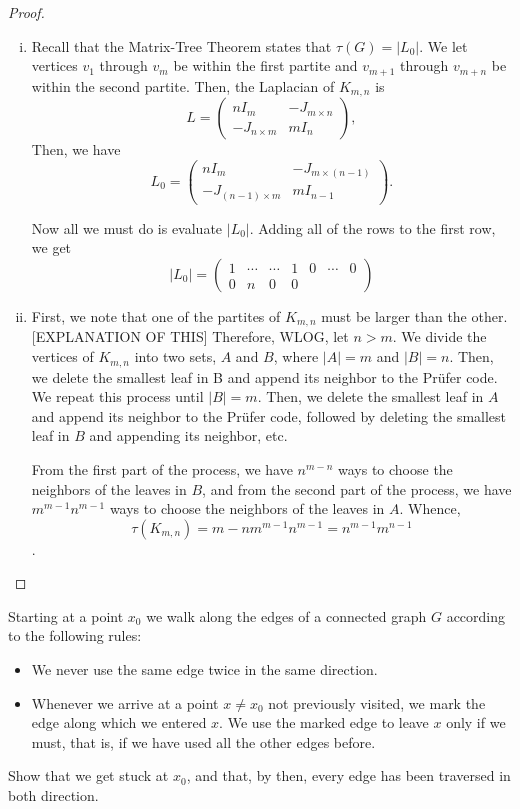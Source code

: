 \documentclass[11pt]{article}
\begin{document}
\begin{proof}
    \begin{enumerate}[(i)]
        \item Recall that the Matrix-Tree Theorem states that $\tau(G) = |L_0|$. We let vertices $v_1$ through $v_m$ be within the first partite and $v_{m+1}$ through $v_{m+n}$ be within the second partite. Then, the Laplacian of $K_{m,n}$ is \[L=\begin{pmatrix}nI_m&-J_{m \times n}\\-J_{n \times m}&mI_n\end{pmatrix},\] Then, we have
        \[
            L_0=\begin{pmatrix}nI_m&-J_{m \times (n-1)}\\-J_{(n-1) \times m}&mI_{n-1}\end{pmatrix}.
        \]

        Now all we must do is evaluate $|L_0|$. Adding all of the rows to the first row, we get
        \[
            |L_0| = \begin{pmatrix}
                1 & \cdots & \cdots & 1 & 0 & \cdots & 0\\
                0 & n & 0 & 0 & 
            \end{pmatrix}
        \]

        \item First, we note that one of the partites of $K_{m,n}$ must be larger than the other. [EXPLANATION OF THIS] Therefore, WLOG, let $n > m$. We divide the vertices of $K_{m,n}$ into two sets, $A$ and $B$, where $|A|=m$ and $|B|=n$. Then, we delete the smallest leaf in B and append its neighbor to the Prüfer code. We repeat this process until $|B|=m$. Then, we delete the smallest leaf in $A$ and append its neighbor to the Prüfer code, followed by deleting the smallest leaf in $B$ and appending its neighbor, etc.
        
        From the first part of the process, we have $n^{m-n}$ ways to choose the neighbors of the leaves in $B$, and from the second part of the process, we have $m^{m-1} n^{m-1}$ ways to choose the neighbors of the leaves in $A$. Whence,
        \[
            \tau(K_{m,n})={m-n}m^{m-1} n^{m-1}=n^{m-1}m^{n-1}
        \].
    \end{enumerate}
\end{proof}
\setcounter{problem}{3}
\begin{quest}
    Starting at a point $x_0$ we walk along the edges of a connected graph $G$ according to the following rules:
    \begin{itemize}
        \item We never use the same edge twice in the same direction.
        \item Whenever we arrive at a point $x\neq x_0$ not previously visited, we mark the edge along which we entered $x$. We use the marked edge to leave $x$ only if we must, that is, if we have used all the other edges before.
    \end{itemize}
    Show that we get stuck at $x_0$, and that, by then, every edge has been traversed in both direction.
\end{quest}
\end{document}
